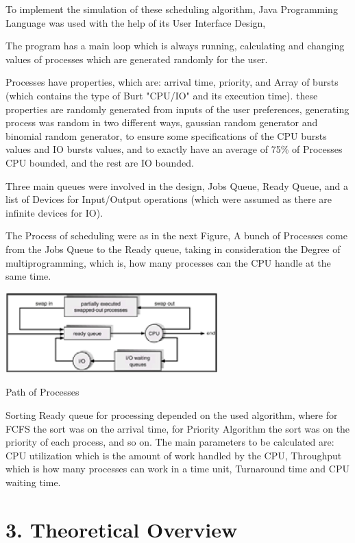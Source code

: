 \documentclass{article} %
\begin{document}
\noindent To implement the simulation of these scheduling algorithm, Java Programming Language was used with the help of its User Interface Design, 

\noindent The program has a main loop which is always running, calculating and changing values of processes which are generated randomly for the user.

\noindent Processes have properties, which are: arrival time, priority, and Array of bursts (which contains the type of Burt "CPU/IO" and its execution time). these properties are randomly generated from inputs of the user preferences, generating process was random in two different ways, gaussian random generator and binomial random generator, to ensure some specifications of the CPU bursts values and IO bursts values, and to exactly have an average of 75\% of Processes CPU bounded, and the rest are IO bounded.

\noindent Three main queues were involved in the design, Jobs Queue, Ready Queue, and a list of Devices for Input/Output operations (which were assumed as there are infinite devices for IO).

\noindent The Process of scheduling were as in the next Figure, A bunch of Processes come from the Jobs Queue to the Ready queue, taking in consideration the Degree of multiprogramming, which is, how many processes can the CPU handle at the same time.

\noindent 

\noindent \includegraphics*[width=3.23in, height=1.22in, keepaspectratio=false]{image5}

\noindent Path of Processes

\noindent Sorting Ready queue for processing depended on the used algorithm, where for FCFS the sort was on the arrival time, for Priority Algorithm the sort was on the priority of each process, and so on. The main parameters to be calculated are: CPU utilization which is the amount of work handled by the CPU, Throughput which is how many processes can work in a time unit, Turnaround time and CPU waiting time.


\section{ 3. Theoretical Overview}
\end{document}
